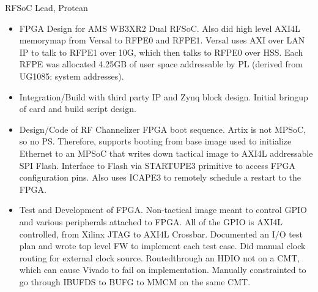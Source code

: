 \documentclass[10pt,final,sans]{resume}
\begin{document}
RFSoC Lead, Protean 
\begin{itemize}
  \item FPGA Design for AMS WB3XR2 Dual RFSoC. Also did high level AXI4L memorymap from Versal to RFPE0 and RFPE1. Versal uses AXI over LAN IP to talk to RFPE1 over 10G, which then talks to RFPE0 over HSS. Each RFPE was allocated 4.25GB of user space addressable by PL (derived from UG1085: system addresses).
  \item Integration/Build with third party IP and Zynq block design. Initial bringup of card and build script design.
  \item Design/Code of RF Channelizer FPGA boot sequence. Artix is not MPSoC, so no PS. Therefore, supports booting from base image used to initialize Ethernet to an MPSoC that writes down tactical image to AXI4L addressable SPI Flash. Interface to Flash via STARTUPE3 primitive to access FPGA configuration pins. Also uses ICAPE3 to remotely schedule a restart to the FPGA. 
  \item Test and Development of FPGA. Non-tactical image meant to control GPIO and various peripherals attached to FPGA. All of the GPIO is AXI4L controlled, from Xilinx JTAG to AXI4L Crossbar. Documented an I/O test plan and wrote top level FW to implement each test case. Did manual clock routing for external clock source. Routedthrough an HDIO not on a CMT, which can cause Vivado to fail on implementation. Manually constrainted to go through IBUFDS to BUFG to MMCM on the same CMT.
\end{itemize}
\end{document}
